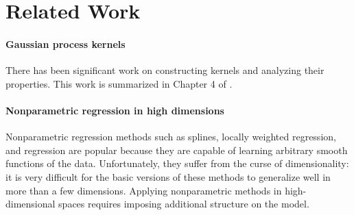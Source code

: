 \documentclass[twoside]{article}
\begin{document}




\section{Related Work}
\label{sec:related_work}


\paragraph{Gaussian process kernels}
There has been significant work on constructing \gp{} kernels and analyzing their properties.
This work is summarized in Chapter 4 of \cite{rasmussen38gaussian}. 

\paragraph{Nonparametric regression in high dimensions}
Nonparametric regression methods such as splines, locally weighted regression, and \gp{} regression are popular because they are capable of learning arbitrary smooth functions of the data.
Unfortunately, they suffer from the curse of dimensionality: it is very difficult for the basic versions of these methods to generalize well in more than a few dimensions.
Applying nonparametric methods in high-dimensional spaces requires imposing additional structure on the model.
\end{document}
